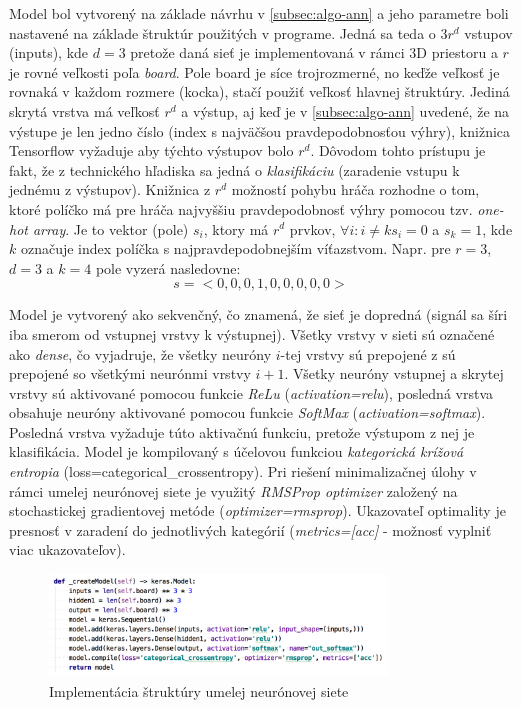 Model bol vytvorený na základe návrhu v \autoref{subsec:algo-ann} a jeho parametre boli nastavené na základe
štruktúr použitých v programe.
Jedná sa teda o $3r^d$ vstupov (inputs), kde $d=3$ pretože daná sieť je implementovaná v rámci 3D priestoru a $r$ je
rovné veľkosti poľa \emph{board}.
Pole board je síce trojrozmerné, no keďže veľkosť je rovnaká v každom rozmere (kocka), stačí použiť veľkosť hlavnej
štruktúry.
Jediná skrytá vrstva má veľkosť $r^d$ a výstup, aj keď je v \autoref{subsec:algo-ann} uvedené, že na výstupe je len
jedno číslo (index s najväčšou pravdepodobnosťou výhry), knižnica Tensorflow vyžaduje aby týchto výstupov bolo $r^d$.
Dôvodom tohto prístupu je fakt, že z technického hľadiska sa jedná o \emph{klasifikáciu} (zaradenie vstupu k jednému z
výstupov).
Knižnica z $r^d$ možností pohybu hráča rozhodne o tom, ktoré políčko má pre hráča najvyššiu pravdepodobnosť výhry
pomocou tzv. \emph{one-hot array}.
Je to vektor (pole) $s_i$, ktory má $r^d$ prvkov, $\forall i : i\neq k s_i=0$ a $s_k=1$, kde $k$ označuje index
políčka s najpravdepodobnejším víťazstvom.
Napr. pre $r=3$, $d=3$ a $k=4$ pole vyzerá nasledovne:
\begin{equation}
    s = <0, 0, 0, 1, 0, 0, 0, 0, 0>
\end{equation}

Model je vytvorený ako sekvenčný, čo znamená, že sieť je dopredná (signál sa šíri iba smerom od vstupnej vrstvy k
výstupnej).
Všetky vrstvy v sieti sú označené ako \emph{dense}, čo vyjadruje, že všetky neuróny $i$-tej vrstvy sú prepojené z sú
prepojené so všetkými neurónmi vrstvy $i+1$.
Všetky neuróny vstupnej a skrytej vrstvy sú aktivované pomocou funkcie \emph{ReLu} (\emph{activation=relu}), posledná
vrstva obsahuje neuróny aktivované pomocou funkcie \emph{SoftMax} (\emph{activation=softmax}).
Posledná vrstva vyžaduje túto aktivačnú funkciu, pretože výstupom z nej je klasifikácia.
Model je kompilovaný s účelovou funkciou \emph{kategorická krížová entropia} (loss=categorical\_crossentropy).
Pri riešení minimalizačnej úlohy v rámci umelej neurónovej siete je využitý \emph{RMSProp optimizer} založený na
stochastickej gradientovej metóde (\emph{optimizer=rmsprop}).
Ukazovateľ optimality je presnosť v zaradení do jednotlivých kategórií (\emph{metrics=[acc]} - možnosť vyplniť viac
ukazovateľov).

\begin{figure}[H]
    \centering
    \includegraphics[width=0.8\textwidth]{images/impl-ann-model.jpg}
    \caption{Implementácia štruktúry umelej neurónovej siete}
\end{figure}\label{figure:ann-model-impl}

